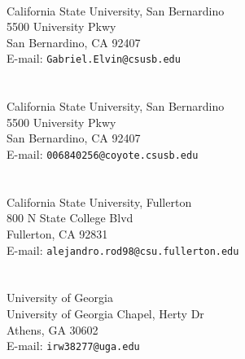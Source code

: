 
 
{\footnotesize  
\medskip
\medskip
\vspace*{1mm} 
 
\\  
California State University, San Bernardino\\
5500 University Pkwy\\
San Bernardino, CA 92407\\
E-mail: {\tt Gabriel.Elvin@csusb.edu}\\ \\ 

\\  
California State University, San Bernardino\\
5500 University Pkwy\\
San Bernardino, CA 92407\\
E-mail: {\tt 006840256@coyote.csusb.edu}\\ \\  

\\  
California State University, Fullerton \\
800 N State College Blvd\\
Fullerton, CA 92831 \\
E-mail: {\tt alejandro.rod98@csu.fullerton.edu}\\ \\

\\  
University of Georgia \\
University of Georgia Chapel, Herty Dr\\ 
Athens, GA 30602\\
E-mail: {\tt irw38277@uga.edu} \\ \\   

}


